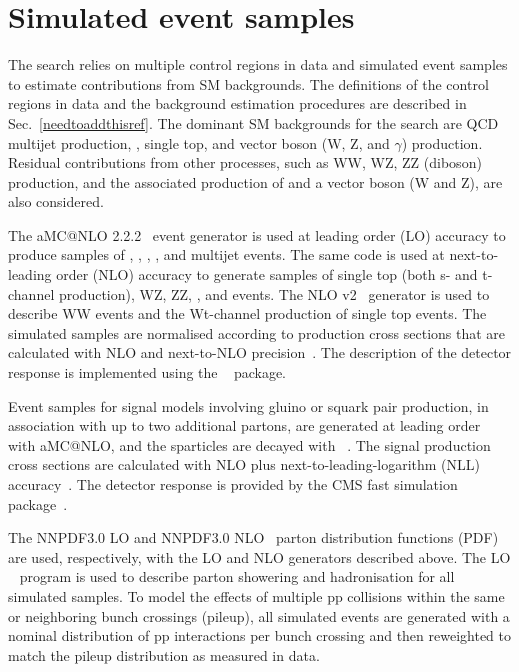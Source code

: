 \section{Simulated event samples}
\label{sec:simulation}

The search relies on multiple control regions in data and simulated
event samples to estimate contributions from SM backgrounds. The
definitions of the control regions in data and the background
estimation procedures are described in
Sec.~\ref{needtoaddthisref}. The dominant SM backgrounds for the
search are QCD multijet production, \ttbar, single top, and vector
boson (W, Z, and $\gamma$) production. Residual contributions from
other processes, such as WW, WZ, ZZ (diboson) production, and the
associated production of \ttbar and a vector boson (W and Z), are also
considered.

The  aMC@NLO 2.2.2~\cite{Alwall2014} event generator is used
at leading order (LO) accuracy to produce samples of \wj, \zj, \gj,
\ttbar, and multijet events. The same code is used at next-to-leading
order (NLO) accuracy to generate samples of single top (both s- and
t-channel production), WZ, ZZ, \ttw, and \ttz events. The NLO \POWHEG
v2~\cite{powheg, powheg_top_Wt} generator is used to describe WW
events and the Wt-channel production of single top events. The
simulated samples are normalised according to production cross
sections that are calculated with NLO and next-to-NLO
precision~\cite{nloxs, wphys, fewz, wwxs, top++, nlotop,
  powheg_top_Wt}. The description of the detector response is
implemented using the \GEANTfour~\cite{geant} package.

Event samples for signal models involving gluino or squark pair
production, in association with up to two additional partons, are
generated at leading order with  aMC@NLO, and the sparticles
are decayed with ~\cite{pythia}. The signal production cross
sections are calculated with NLO plus next-to-leading-logarithm (NLL)
accuracy~\cite{Beenakker:1996ch, PhysRevLett.102.111802,
  PhysRevD.80.095004, 1126-6708-2009-12-041,
  doi:10.1142/S0217751X11053560, susynlo}. The detector response is
provided by the CMS fast simulation package~\cite{fastsim}.

The \textsc{NNPDF}3.0 LO and \textsc{NNPDF}3.0 NLO~\cite{nnpdf} parton
distribution functions (PDF) are used, respectively, with the LO and
NLO generators described above. The LO ~\cite{pythia}
program is used to describe parton showering and hadronisation for all
simulated samples. To model the effects of multiple pp collisions
within the same or neighboring bunch crossings (pileup), all simulated
events are generated with a nominal distribution of pp interactions
per bunch crossing and then reweighted to match the pileup
distribution as measured in data.


